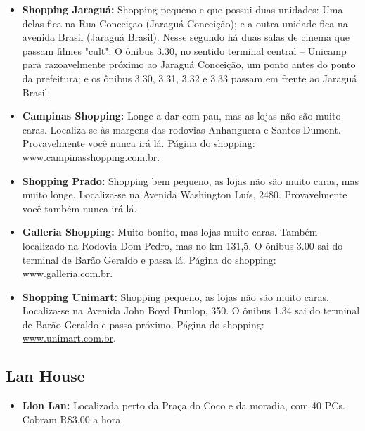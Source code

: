 \begin{itemize}
\item  \textbf{Shopping Jaraguá:} Shopping pequeno e que possui duas unidades: Uma delas fica na Rua Conceiçao (Jaraguá Conceição); e a outra unidade fica na avenida Brasil (Jaraguá Brasil). Nesse segundo há duas salas de cinema que passam filmes "cult". O ônibus 3.30, no sentido terminal central -- Unicamp para razoavelmente próximo ao Jaraguá Conceição, um ponto antes do ponto da prefeitura; e os ônibus 3.30, 3.31, 3.32 e 3.33 passam em frente ao Jaraguá Brasil.
\end{itemize}

\begin{itemize}
\item  \textbf{Campinas Shopping:} Longe a dar com pau, mas as lojas não são muito caras. Localiza-se às margens das rodovias Anhanguera e Santos Dumont. Provavelmente você nunca irá lá. Página do shopping: \url{www.campinasshopping.com.br}.
\end{itemize}

\begin{itemize}
\item  \textbf{Shopping Prado:} Shopping bem pequeno, as lojas não são muito caras, mas muito longe. Localiza-se na Avenida Washington Luís, 2480. Provavelmente você também nunca irá lá.
\end{itemize}

\begin{itemize}
\item  \textbf{Galleria Shopping:} Muito bonito, mas lojas muito caras. Também localizado na Rodovia Dom Pedro, mas no km 131,5. O ônibus 3.00 sai do terminal de Barão Geraldo e passa lá. Página do shopping: \url{www.galleria.com.br}.
\end{itemize}

\begin{itemize}
\item  \textbf{Shopping Unimart:} Shopping pequeno, as lojas não são muito caras. Localiza-se na Avenida John Boyd Dunlop, 350. O ônibus 1.34 sai do terminal de Barão Geraldo e passa próximo. Página do shopping: \url{www.unimart.com.br}.
\end{itemize}

\subsection{Lan House}

\begin{itemize}
\item  \textbf{Lion Lan:} Localizada perto da Praça do Coco e da moradia, com 40 PCs. Cobram R\$3,00 a hora.
\end{itemize}
